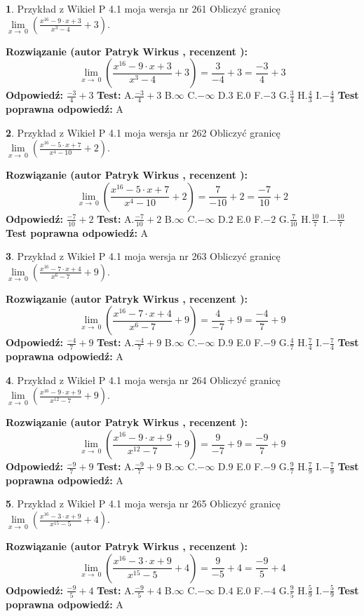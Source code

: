\documentclass[12pt, a4paper]{article}
\theoremstyle{definition} %
\newtheorem{zad}{}
\newcommand{\zadStart}[1]{\begin{zad}#1\newline}
\newcommand{\zadStop}{\end{zad}}
\newcommand{\rozwStart}[2]{\noindent \textbf{Rozwiązanie (autor #1 , recenzent #2): }\newline}
\newcommand{\rozwStop}{\newline}
\newcommand{\odpStart}{\noindent \textbf{Odpowiedź:}\newline}
\newcommand{\odpStop}{\newline}
\newcommand{\testStart}{\noindent \textbf{Test:}\newline}
\newcommand{\testStop}{\newline}
\newcommand{\kluczStart}{\noindent \textbf{Test poprawna odpowiedź:}\newline}
\newcommand{\kluczStop}{\newline}
\begin{document}
\zadStart{Przykład z Wikieł P 4.1 moja wersja nr 261}
Obliczyć granicę $\lim\limits_{x\to\ 0}(\frac{x^{16}-9 \cdot x +3}{x^{3}-4}+3)$.
\zadStop
\rozwStart{Patryk Wirkus}{}
$$\lim\limits_{x\to\ 0}(\frac{x^{16}-9 \cdot x +3}{x^{3}-4}+3)=\frac{3}{-4}+3=\frac{-3}{4}+3$$
\rozwStop
\odpStart
$\frac{-3}{4}+3$
\odpStop
\testStart
A.$\frac{-3}{4}+3$
B.$\infty$
C.$-\infty$
D.$3$
E.$0$
F.$-3$
G.$\frac{3}{4}$
H.$\frac{4}{3}$
I.$-\frac{4}{3}$
\testStop
\kluczStart
A
\kluczStop



\zadStart{Przykład z Wikieł P 4.1 moja wersja nr 262}
Obliczyć granicę $\lim\limits_{x\to\ 0}(\frac{x^{16}-5 \cdot x +7}{x^{4}-10}+2)$.
\zadStop
\rozwStart{Patryk Wirkus}{}
$$\lim\limits_{x\to\ 0}(\frac{x^{16}-5 \cdot x +7}{x^{4}-10}+2)=\frac{7}{-10}+2=\frac{-7}{10}+2$$
\rozwStop
\odpStart
$\frac{-7}{10}+2$
\odpStop
\testStart
A.$\frac{-7}{10}+2$
B.$\infty$
C.$-\infty$
D.$2$
E.$0$
F.$-2$
G.$\frac{7}{10}$
H.$\frac{10}{7}$
I.$-\frac{10}{7}$
\testStop
\kluczStart
A
\kluczStop



\zadStart{Przykład z Wikieł P 4.1 moja wersja nr 263}
Obliczyć granicę $\lim\limits_{x\to\ 0}(\frac{x^{16}-7 \cdot x +4}{x^{6}-7}+9)$.
\zadStop
\rozwStart{Patryk Wirkus}{}
$$\lim\limits_{x\to\ 0}(\frac{x^{16}-7 \cdot x +4}{x^{6}-7}+9)=\frac{4}{-7}+9=\frac{-4}{7}+9$$
\rozwStop
\odpStart
$\frac{-4}{7}+9$
\odpStop
\testStart
A.$\frac{-4}{7}+9$
B.$\infty$
C.$-\infty$
D.$9$
E.$0$
F.$-9$
G.$\frac{4}{7}$
H.$\frac{7}{4}$
I.$-\frac{7}{4}$
\testStop
\kluczStart
A
\kluczStop



\zadStart{Przykład z Wikieł P 4.1 moja wersja nr 264}
Obliczyć granicę $\lim\limits_{x\to\ 0}(\frac{x^{16}-9 \cdot x +9}{x^{12}-7}+9)$.
\zadStop
\rozwStart{Patryk Wirkus}{}
$$\lim\limits_{x\to\ 0}(\frac{x^{16}-9 \cdot x +9}{x^{12}-7}+9)=\frac{9}{-7}+9=\frac{-9}{7}+9$$
\rozwStop
\odpStart
$\frac{-9}{7}+9$
\odpStop
\testStart
A.$\frac{-9}{7}+9$
B.$\infty$
C.$-\infty$
D.$9$
E.$0$
F.$-9$
G.$\frac{9}{7}$
H.$\frac{7}{9}$
I.$-\frac{7}{9}$
\testStop
\kluczStart
A
\kluczStop



\zadStart{Przykład z Wikieł P 4.1 moja wersja nr 265}
Obliczyć granicę $\lim\limits_{x\to\ 0}(\frac{x^{16}-3 \cdot x +9}{x^{15}-5}+4)$.
\zadStop
\rozwStart{Patryk Wirkus}{}
$$\lim\limits_{x\to\ 0}(\frac{x^{16}-3 \cdot x +9}{x^{15}-5}+4)=\frac{9}{-5}+4=\frac{-9}{5}+4$$
\rozwStop
\odpStart
$\frac{-9}{5}+4$
\odpStop
\testStart
A.$\frac{-9}{5}+4$
B.$\infty$
C.$-\infty$
D.$4$
E.$0$
F.$-4$
G.$\frac{9}{5}$
H.$\frac{5}{9}$
I.$-\frac{5}{9}$
\testStop
\kluczStart
A
\kluczStop
\end{document}
